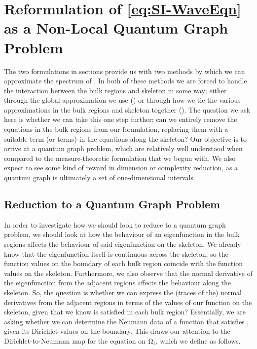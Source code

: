 \section{Reformulation of \eqref{eq:SI-WaveEqn} as a Non-Local Quantum Graph Problem}


The two formulations in sections  provide us with two methods by which we can approximate the spectrum of .
In both of these methods we are forced to handle the interaction between the bulk regions and skeleton in some way; either through the global approximation we use () or through how we tie the various approximations in the bulk regions and skeleton together ().
The question we ask here is whether we can take this one step further; can we entirely remove the equations in the bulk regions from our formulation, replacing them with a suitable term (or terms) in the equations along the skeleton?
Our objective is to arrive at a quantum graph problem, which are relatively well understood when compared to the measure-theoretic formulation  that we begun with.
We also expect to see some kind of reward in dimension or complexity reduction, as a quantum graph is ultimately a set of one-dimensional intervals.

\subsection{Reduction to a Quantum Graph Problem} \label{ssec:SI-ToQG}
In order to investigate how we should look to reduce  to a quantum graph problem, we should look at how the behaviour of an eigenfunction in the bulk regions affects the behaviour of said eigenfunction on the skeleton.
We already know that the eigenfunction itself is continuous across the skeleton, so the function values on the boundary of each bulk region coincide with the function values on the skeleton.
Furthermore, we also observe that the normal derivative of the eigenfunction from the adjacent regions affects the behaviour along the skeleton.
So, the question is whether we can express the (traces of the) normal derivatives from the adjacent regions in terms of the values of our function on the skeleton, given that we know  is satisfied in each bulk region?
Essentially, we are asking whether we can determine the Neumann data of a function that satisfies , given its Dirichlet values on the boundary.
This draws our attention to the Dirichlet-to-Neumann map for the  equation on $\Omega_i$, which we define as follows.

